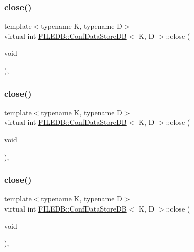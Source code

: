 \subsubsection{\texorpdfstring{close()}{close()}\hspace{0.1cm}{\footnotesize\ttfamily [1/3]}}
{\footnotesize\ttfamily template$<$typename K, typename D$>$ \\
virtual int \mbox{\hyperlink{classFILEDB_1_1ConfDataStoreDB}{F\+I\+L\+E\+D\+B\+::\+Conf\+Data\+Store\+DB}}$<$ K, D $>$\+::close (\begin{DoxyParamCaption}\item[{void}]{ }\end{DoxyParamCaption})\hspace{0.3cm}{\ttfamily [inline]}, {\ttfamily [virtual]}}

\mbox{\label{classFILEDB_1_1ConfDataStoreDB_aa322ea0136b8eacc11df2b5b52b3b6d5}} 
\subsubsection{\texorpdfstring{close()}{close()}\hspace{0.1cm}{\footnotesize\ttfamily [2/3]}}
{\footnotesize\ttfamily template$<$typename K, typename D$>$ \\
virtual int \mbox{\hyperlink{classFILEDB_1_1ConfDataStoreDB}{F\+I\+L\+E\+D\+B\+::\+Conf\+Data\+Store\+DB}}$<$ K, D $>$\+::close (\begin{DoxyParamCaption}\item[{void}]{ }\end{DoxyParamCaption})\hspace{0.3cm}{\ttfamily [inline]}, {\ttfamily [virtual]}}

\mbox{\label{classFILEDB_1_1ConfDataStoreDB_aa322ea0136b8eacc11df2b5b52b3b6d5}} 
\subsubsection{\texorpdfstring{close()}{close()}\hspace{0.1cm}{\footnotesize\ttfamily [3/3]}}
{\footnotesize\ttfamily template$<$typename K, typename D$>$ \\
virtual int \mbox{\hyperlink{classFILEDB_1_1ConfDataStoreDB}{F\+I\+L\+E\+D\+B\+::\+Conf\+Data\+Store\+DB}}$<$ K, D $>$\+::close (\begin{DoxyParamCaption}\item[{void}]{ }\end{DoxyParamCaption})\hspace{0.3cm}{\ttfamily [inline]}, {\ttfamily [virtual]}}


